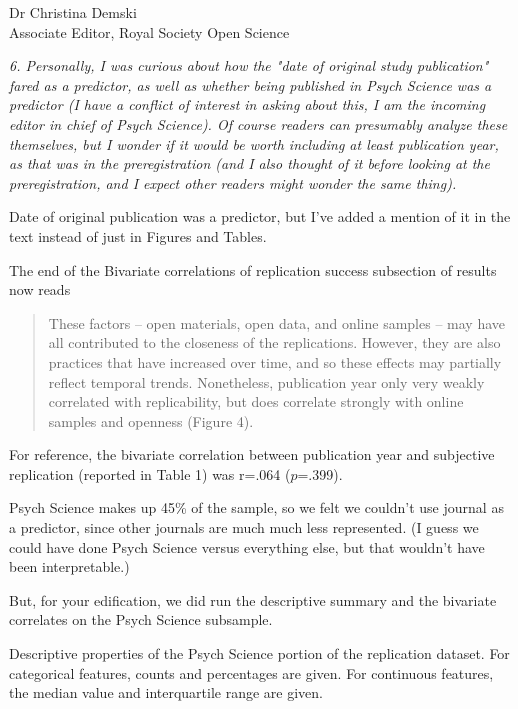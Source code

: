 \documentclass{stanfordletter}
\newcommand{\theysaid}[1]{\begin{leftbar} \noindent 
		\textsl{ #1}\end{leftbar}}
\newcommand{\revised}[1]{\begin{quote}	#1 \end{quote}}
\begin{document}
\begin{letter}{Dr Christina Demski \\ Associate Editor, Royal Society Open Science}
          \theysaid{
          	6. Personally, I was curious about how the "date of original study publication" fared as a predictor, as well as whether being published in Psych Science was a predictor (I have a conflict of interest in asking about this, I am the incoming editor in chief of Psych Science).  Of course readers can presumably analyze these themselves, but I wonder if it would be worth including at least publication year, as that was in the preregistration (and I also thought of it before looking at the preregistration, and I expect other readers might wonder the same thing).
          }
          
          Date of original publication was a predictor, but I've added a mention of it in the text instead of just in Figures and Tables. 
       
          The end of the Bivariate correlations of replication success subsection of results now reads
          
          \revised{These factors -- open materials, open data, and online samples --  may have all contributed to the closeness of the replications. However, they are also practices that have increased over time, and so these effects may partially reflect temporal trends. Nonetheless, publication year only very weakly correlated with replicability, but does correlate strongly with online samples and openness (Figure 4).}
          
          For reference, the bivariate correlation between publication year and subjective replication (reported in Table 1) was r=.064 ($p$=.399). 
          	

          
          Psych Science makes up 45\% of the sample, so we felt we couldn't use journal as a predictor, since other journals are much much less represented. (I guess we could have done Psych Science versus everything else, but that wouldn't have been interpretable.)
          
          But, for your edification, we did run the descriptive summary and the bivariate correlates on the Psych Science subsample. 
          
           
          
\begin{center}
          
          Descriptive properties of the Psych Science portion of the replication dataset. For categorical features, counts and percentages are given. For continuous features, the median value and interquartile range are given. 


\end{center}
\end{letter}
\end{document}
